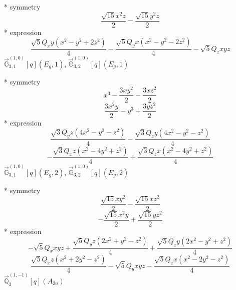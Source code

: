 \documentclass[fleqn,8pt]{jsarticle}
\begin{document}
\noindent\quad ** symmetry
\begin{dmath*}
\frac{\sqrt{15} x^{2} z}{2} - \frac{\sqrt{15} y^{2} z}{2}
\end{dmath*}
\noindent\quad ** expression
\begin{dmath*}
\frac{\sqrt{5} Q_{x} y \left(x^{2} - y^{2} + 2 z^{2}\right)}{4} - \frac{\sqrt{5} Q_{y} x \left(x^{2} - y^{2} - 2 z^{2}\right)}{4} - \sqrt{5} Q_{z} x y z
\end{dmath*}
\noindent\quad $\vec{\mathbb{G}}_{3,1}^{(1,0)}[q](E_{g},1)$, $\vec{\mathbb{G}}_{3,2}^{(1,0)}[q](E_{g},1)$

\noindent\quad ** symmetry
\begin{dmath*}
x^{3} - \frac{3 x y^{2}}{2} - \frac{3 x z^{2}}{2}
\end{dmath*}
\begin{dmath*}
\frac{3 x^{2} y}{2} - y^{3} + \frac{3 y z^{2}}{2}
\end{dmath*}
\noindent\quad ** expression
\begin{dmath*}
\frac{\sqrt{3} Q_{y} z \left(4 x^{2} - y^{2} - z^{2}\right)}{4} - \frac{\sqrt{3} Q_{z} y \left(4 x^{2} - y^{2} - z^{2}\right)}{4}
\end{dmath*}
\begin{dmath*}
- \frac{\sqrt{3} Q_{x} z \left(x^{2} - 4 y^{2} + z^{2}\right)}{4} + \frac{\sqrt{3} Q_{z} x \left(x^{2} - 4 y^{2} + z^{2}\right)}{4}
\end{dmath*}
\noindent\quad $\vec{\mathbb{G}}_{3,1}^{(1,0)}[q](E_{g},2)$, $\vec{\mathbb{G}}_{3,2}^{(1,0)}[q](E_{g},2)$

\noindent\quad ** symmetry
\begin{dmath*}
\frac{\sqrt{15} x y^{2}}{2} - \frac{\sqrt{15} x z^{2}}{2}
\end{dmath*}
\begin{dmath*}
- \frac{\sqrt{15} x^{2} y}{2} + \frac{\sqrt{15} y z^{2}}{2}
\end{dmath*}
\noindent\quad ** expression
\begin{dmath*}
- \sqrt{5} Q_{x} x y z + \frac{\sqrt{5} Q_{y} z \left(2 x^{2} + y^{2} - z^{2}\right)}{4} + \frac{\sqrt{5} Q_{z} y \left(2 x^{2} - y^{2} + z^{2}\right)}{4}
\end{dmath*}
\begin{dmath*}
\frac{\sqrt{5} Q_{x} z \left(x^{2} + 2 y^{2} - z^{2}\right)}{4} - \sqrt{5} Q_{y} x y z - \frac{\sqrt{5} Q_{z} x \left(x^{2} - 2 y^{2} - z^{2}\right)}{4}
\end{dmath*}
\noindent\quad $\vec{\mathbb{Q}}_{3}^{(1,-1)}[q](A_{2u})$
\end{document}
